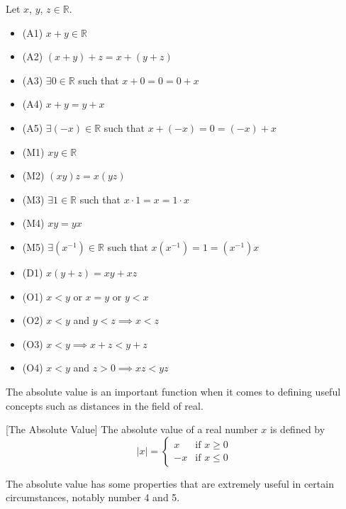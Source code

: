 \begin{prp}{}{} Let $x$, $y$, $z\in\mathbb{R}$. 
\begin{itemize}
\item (A1) $x+y\in\mathbb{R}$
\item (A2) $(x+y)+z=x+(y+z)$
\item (A3) $\exists 0\in\mathbb{R}$ such that $x+0=0=0+x$
\item (A4) $x+y=y+x$
\item (A5) $\exists(-x)\in\mathbb{R}$ such that $x+(-x)=0=(-x)+x$
\item (M1) $xy\in\mathbb{R}$
\item (M2) $(xy)z=x(yz)$
\item (M3) $\exists 1\in\mathbb{R}$ such that $x\cdot1=x=1\cdot x$
\item (M4) $xy=yx$
\item (M5) $\exists (x^{-1})\in\mathbb{R}$ such that $x(x^{-1})=1=(x^{-1})x$
\item (D1) $x(y+z)=xy+xz$
\item (O1) $x<y$ or $x=y$ or $y<x$
\item (O2) $x<y$ and $y<z\implies x<z$
\item (O3) $x<y\implies x+z<y+z$
\item (O4) $x<y$ and $z>0\implies xz<yz$
\end{itemize}
\end{prp}

The absolute value is an important function when it comes to defining useful concepts such as distances in the field of real. 

\begin{defn}{}{}[The Absolute Value] The absolute value of a real number $x$ is defined by
$$|x|=\begin{cases}
x & \text{if $x\geq0$} \\
-x & \text{if $x\leq0$}
\end{cases}$$
\end{defn}

The absolute value has some properties that are extremely useful in certain circumstances, notably number 4 and 5. 

